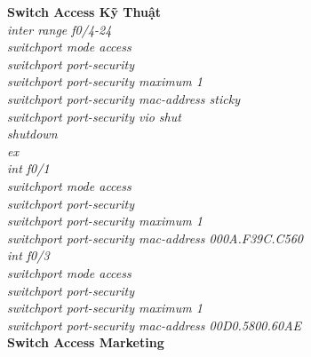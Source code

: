 \documentclass[a4paper, 12pt]{article}
\begin{document}
\hspace*{1cm}\textbf{Switch Access Kỹ Thuật}\\
\hspace*{2cm}\textit{inter range f0/4-24\\
\hspace*{2cm}switchport mode access\\
\hspace*{2cm}switchport port-security\\
\hspace*{2cm}switchport port-security maximum 1\\
\hspace*{2cm}switchport port-security mac-address sticky\\
\hspace*{2cm}switchport port-security vio shut\\
\hspace*{2cm}shutdown\\
\hspace*{2cm}ex\\
\hspace*{2cm}int f0/1\\
\hspace*{2cm}switchport mode access\\
\hspace*{2cm}switchport port-security\\
\hspace*{2cm}switchport port-security maximum 1\\
\hspace*{2cm}switchport port-security mac-address 000A.F39C.C560\\
\hspace*{2cm}int f0/3\\
\hspace*{2cm}switchport mode access\\
\hspace*{2cm}switchport port-security\\
\hspace*{2cm}switchport port-security maximum 1\\
\hspace*{2cm}switchport port-security mac-address 00D0.5800.60AE\\}
\hspace*{1cm}\textbf{Switch Access Marketing}\\
\end{document}
